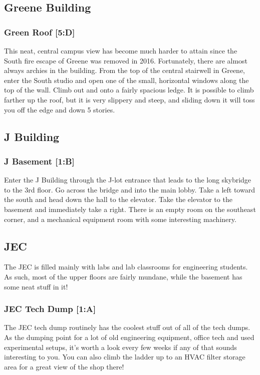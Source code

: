 \documentclass{article}
\begin{document}
\pagebreak
 \subsection{Greene Building}
\subsubsection{Green Roof [5:D]}
This neat, central campus view has become much harder to attain since the South fire escape of Greene was removed in 2016. Fortunately, there are almost always archies in the building. From the top of the central stairwell in Greene, enter the South studio and open one of the small, horizontal windows along the top of the wall. Climb out and onto a fairly spacious ledge. It is possible to climb farther up the roof, but it is very slippery and steep, and sliding down it will toss you off the edge and down 5 stories.
\pagebreak
\subsection{J Building}
\subsubsection{J Basement [1:B]}
Enter the J Building through the J-lot entrance that leads to the long skybridge to the 3rd floor. Go across the bridge and into the main lobby. Take a left toward the south and head down the hall to the elevator. Take the elevator to the basement and immediately take a right. There is an empty room on the southeast corner, and a mechanical equipment room with some interesting machinery.
\pagebreak
\subsection{JEC}
The JEC is filled mainly with labs and lab classrooms for engineering students. As such, most of the upper floors are fairly mundane, while the basement has some neat stuff in it!
\subsubsection{JEC Tech Dump [1:A]}
The JEC tech dump routinely has the coolest stuff out of all of the tech dumps. As the dumping point for a lot of old engineering equipment, office tech and used experimental setups, it’s worth a look every few weeks if any of that sounds interesting to you. You can also climb the ladder up to an HVAC filter storage area for a great view of the shop there!
\end{document}
